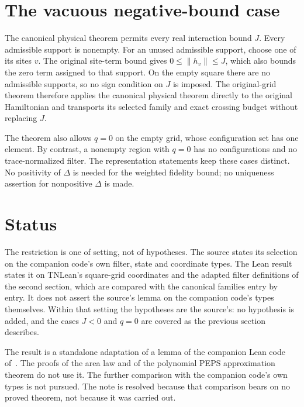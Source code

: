 \documentclass{article}
\begin{document}
\section{The vacuous negative-bound case}

The canonical physical theorem permits every real interaction bound $J$.
Every admissible support is nonempty. For an unused admissible support, choose
one of its sites $v$. The original site-term bound gives
$0\le\|h_v\|\le J$, which also bounds the zero term assigned to that support.
On the empty square there are no admissible supports, so no sign condition on
$J$ is imposed. The original-grid theorem therefore applies the canonical
physical theorem directly to the original Hamiltonian and transports its
selected family and exact crossing budget without replacing $J$.

The theorem also allows $q=0$ on the empty grid, whose configuration set has
one element. By contrast, a nonempty region with $q=0$ has no configurations
and no trace-normalized filter. The representation statements keep these
cases distinct. No positivity of $\Delta$ is needed for the weighted fidelity
bound; no uniqueness assertion for nonpositive $\Delta$ is made.

\section{Status}

The restriction is one of setting, not of hypotheses. The source states its
selection on the companion code's own filter, state and coordinate types.
The Lean result states it on TNLean's square-grid coordinates and the adapted
filter definitions of the second section, which are compared with the
canonical families entry by entry. It does not assert the source's lemma on
the companion code's types themselves. Within that setting the hypotheses are
the source's: no hypothesis is added, and the cases $J<0$ and $q=0$ are
covered as the previous section describes.

The result is a standalone adaptation of a lemma of the companion Lean code
of~\cite{OpenAI2026PolynomialPEPS}. The proofs of the area law and of the
polynomial PEPS approximation theorem do not use it. The further comparison
with the companion code's own types is not pursued. The note is resolved
because that comparison bears on no proved theorem, not because it was carried
out.



\end{document}
